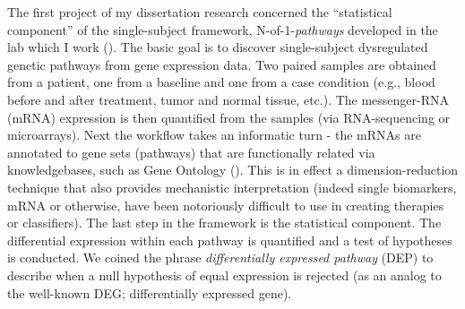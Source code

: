 The first project of my dissertation research concerned the ``statistical component'' of the single-subject framework, N-of-1-\emph{pathways} developed in the lab which I work (\cite{Gardeux2014}). The basic goal is to discover single-subject dysregulated genetic pathways from gene expression data. Two paired samples are obtained from a patient, one from a baseline and one from a case condition (e.g., blood before and after treatment, tumor and normal tissue, etc.). The messenger-RNA (mRNA) expression is then quantified from the samples (via RNA-sequencing or microarrays). Next the workflow takes an informatic turn - the mRNAs are annotated to gene sets (pathways) that are functionally related via knowledgebases, such as Gene Ontology (\cite{Ashburner2000}). This is in effect a dimension-reduction technique that also provides mechanistic interpretation (indeed single biomarkers, mRNA or otherwise, have been notoriously difficult to use in creating therapies or classifiers). The last step in the framework is the statistical component. The differential expression within each pathway is quantified and a test of hypotheses is conducted. We coined the phrase \emph{differentially expressed pathway} (DEP) to describe when a null hypothesis of equal expression is rejected (as an analog to the well-known DEG; differentially expressed gene). 


